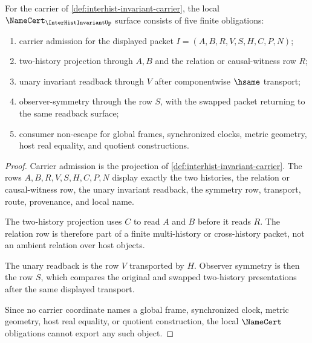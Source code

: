 \begin{theorem}
\label{thm:interhist-invariant-namecert-obligations}
For the carrier of \autoref{def:interhist-invariant-carrier}, the local $\NameCert_{\InterHistInvariantUp}$ surface consists of five finite obligations:
\begin{enumerate}
\item carrier admission for the displayed packet $I=(A,B,R,V,S,H,C,P,N)$;
\item two-history projection through $A,B$ and the relation or causal-witness row $R$;
\item unary invariant readback through $V$ after componentwise $\hsame$ transport;
\item observer-symmetry through the row $S$, with the swapped packet returning to the same readback surface;
\item consumer non-escape for global frames, synchronized clocks, metric geometry, host real equality, and quotient constructions.
\end{enumerate}
\end{theorem}
\begin{proof}
Carrier admission is the projection of \autoref{def:interhist-invariant-carrier}. The rows $A,B,R,V,S,H,C,P,N$ display exactly the two histories, the relation or causal-witness row, the unary invariant readback, the symmetry row, transport, route, provenance, and local name.

The two-history projection uses $C$ to read $A$ and $B$ before it reads $R$. The relation row is therefore part of a finite multi-history or cross-history packet, not an ambient relation over host objects.

The unary readback is the row $V$ transported by $H$. Observer symmetry is then the row $S$, which compares the original and swapped two-history presentations after the same displayed transport.

Since no carrier coordinate names a global frame, synchronized clock, metric geometry, host real equality, or quotient construction, the local $\NameCert$ obligations cannot export any such object.
\end{proof}

